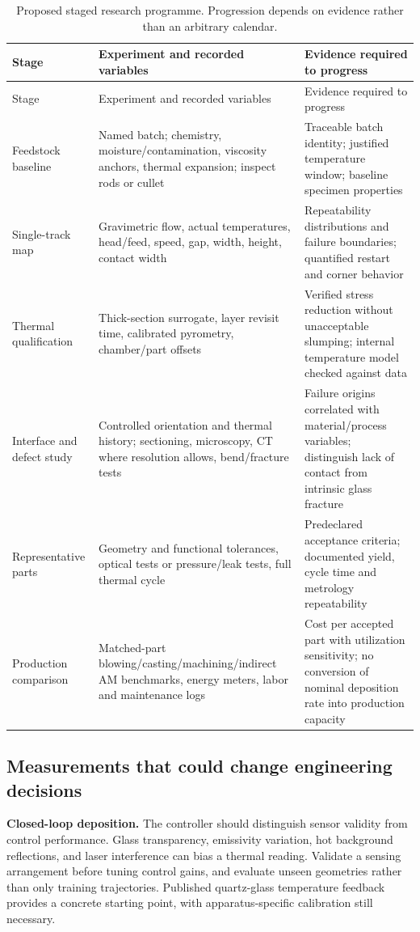 \begin{longtable}{@{}P{.18\textwidth}P{.34\textwidth}P{.39\textwidth}@{}}
\caption{Proposed staged research programme. Progression depends on evidence rather than an arbitrary calendar.}\label{tab:roadmap}\\
\toprule Stage & Experiment and recorded variables & Evidence required to progress \\
\midrule\endfirsthead
\toprule Stage & Experiment and recorded variables & Evidence required to progress \\
\midrule\endhead
Feedstock baseline & Named batch; chemistry, moisture/contamination, viscosity anchors, thermal expansion; inspect rods or cullet & Traceable batch identity; justified temperature window; baseline specimen properties \\
Single-track map & Gravimetric flow, actual temperatures, head/feed, speed, gap, width, height, contact width & Repeatability distributions and failure boundaries; quantified restart and corner behavior \\
Thermal qualification & Thick-section surrogate, layer revisit time, calibrated pyrometry, chamber/part offsets & Verified stress reduction without unacceptable slumping; internal temperature model checked against data \\
Interface and defect study & Controlled orientation and thermal history; sectioning, microscopy, CT where resolution allows, bend/fracture tests & Failure origins correlated with material/process variables; distinguish lack of contact from intrinsic glass fracture \\
Representative parts & Geometry and functional tolerances, optical tests or pressure/leak tests, full thermal cycle & Predeclared acceptance criteria; documented yield, cycle time and metrology repeatability \\
Production comparison & Matched-part blowing/casting/machining/indirect AM benchmarks, energy meters, labor and maintenance logs & Cost per accepted part with utilization sensitivity; no conversion of nominal deposition rate into production capacity \\
\bottomrule\end{longtable}

\subsection{Measurements that could change engineering decisions}
\textbf{Closed-loop deposition.} The controller should distinguish sensor validity from control performance. Glass transparency, emissivity variation, hot background reflections, and laser interference can bias a thermal reading. Validate a sensing arrangement before tuning control gains, and evaluate unseen geometries rather than only training trajectories. Published quartz-glass temperature feedback provides a concrete starting point, with apparatus-specific calibration still necessary.\cite{acad_chen2025}

